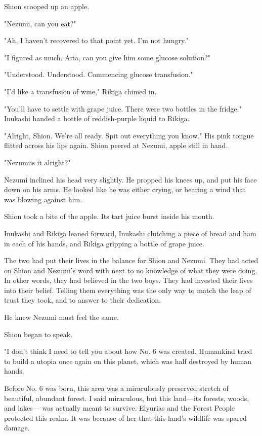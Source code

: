 Shion scooped up an apple.

"Nezumi, can you eat?"

"Ah, I haven't recovered to that point yet. I'm not hungry."

"I figured as much. Aria, can you give him some glucose solution?"

{\sffamily "Understood. Understood. Commencing glucose transfusion."}

"I'd like a transfusion of wine," Rikiga chimed in.

"You'll have to settle with grape juice. There were two bottles in the
fridge." Inukashi handed a bottle of reddish-purple liquid to Rikiga.

"Alright, Shion. We're all ready. Spit out everything you know." His
pink tongue flitted across his lips again. Shion peered at Nezumi, apple
still in hand.

"Nezumi\el is it alright?"

Nezumi inclined his head very slightly. He propped his knees up, and put
his face down on his arms. He looked like he was either crying, or
bearing a wind that was blowing against him.

Shion took a bite of the apple. Its tart juice burst inside his mouth.

Inukashi and Rikiga leaned forward, Inukashi clutching a piece of bread
and ham in each of his hands, and Rikiga gripping a bottle of grape
juice.

The two had put their lives in the balance for Shion and Nezumi. They
had acted on Shion and Nezumi's word with next to no knowledge of what
they were doing. In other words, they had believed in the two boys. They
had invested their lives into their belief. Telling them everything was
the only way to match the leap of trust they took, and to answer to
their dedication.

He knew Nezumi must feel the same.

Shion began to speak.

\myspace

"I don't think I need to tell you about how No. 6 was created. Humankind
tried to build a utopia once again on this planet, which was half
destroyed by human hands.

Before No. 6 was born, this area was a miraculously preserved stretch of
beautiful, abundant forest. I said miraculous, but this land---its
forests, woods, and lakes--- was actually meant to survive. Elyurias and
the Forest People protected this realm. It was because of her that this
land's wildlife was spared damage.

